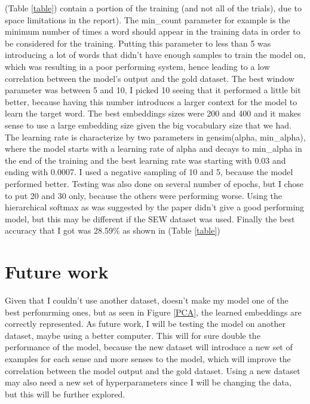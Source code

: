 \documentclass[paper=a4, fontsize=10pt, oneside]{scrartcl}
\begin{document}
\begin{adjustwidth}{-60pt}{-60pt}
(Table \ref{table}) contain a portion of the training (and not all of the trials), due to space limitations in the report). The min\_count parameter for example is the minimum number of times a word should appear in the training data in order to be considered for the training. Putting this parameter to less than 5 was introducing a lot of words that didn't have enough samples to train the model on, which was resulting in a poor performing system, hence leading to a low correlation between the model's output and the gold dataset. The best window parameter was between 5 and 10, I picked 10 seeing that it performed a little bit better, because having this number introduces a larger context for the model to learn the target word. The best embeddings sizes were 200 and 400 and it makes sense to use a large embedding size given the big vocabulary size that we had. The learning rate is characterize by two parameters in gensim(alpha, min\_alpha), where the model starts with a learning rate of alpha and decays to min\_alpha in the end of the training and the best learning rate was starting with 0.03 and ending with 0.0007. I used a negative sampling of 10 and 5, because the model performed better. Testing was also done on several number of epochs, but I chose to put 20 and 30 only, because the others were performing worse. Using the hierarchical softmax as was suggested by the paper didn't give a good performing model, but this may be different if the SEW dataset was used. Finally the best accuracy that I got was 28.59\% as shown in (Table \ref{table})

\section{Future work}

Given that I couldn't use another dataset, doesn't make my model one of the best perfomrming ones, but as seen in Figure \ref{PCA}, the learned embeddings are correctly represented. As future work, I will be testing the model on another dataset, maybe using a better computer. This will for sure double the performance of the model, because the new dataset will introduce a new set of examples for each sense and more senses to the model, which will improve the correlation between the model output and the gold dataset. Using a new dataset may also need a new set of hyperparameters since I will be changing the data, but this will be further explored.
\end{adjustwidth}
\end{document}
